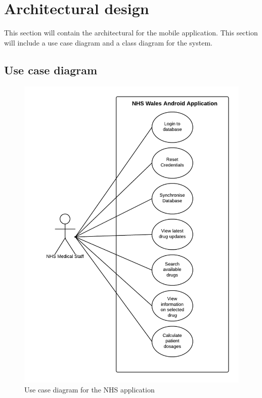\documentclass[11pt,fleqn,twoside]{article}
\begin{document}
\section{Architectural design}
This section will contain the architectural for the mobile application. This section will include a use case diagram and a class diagram for the system.

\subsection{Use case diagram}
\begin{figure}[H]
\centering
\includegraphics[width=5.5in]{useCase}
\caption{Use case diagram for the NHS application}
\end{figure}
\end{document}
